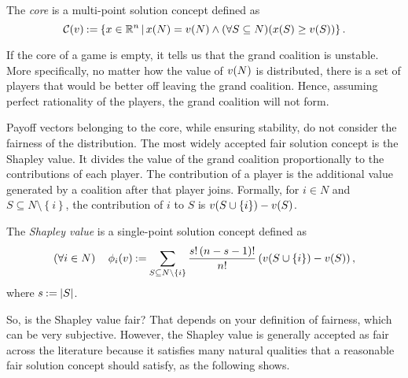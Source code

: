 \begin{defi}
	The \emph{core} is a multi-point solution concept defined as \[
		\core v \deq \left\{ x \in \R^n \suchthat \fce{x}{N} =\fce{v}{N} \land \left( \forall S \subseteq N \right)\! \left( \fce{x}{S} \geq \fce{v}{S} \right) \right\}.
	\]
\end{defi}

If the core of a game is empty, it tells us that the grand coalition is unstable.
More specifically, no matter how the value of $ \fce{v}{N} $ is distributed, there is a set of players that would be better off leaving the grand coalition.
Hence, assuming perfect rationality of the players, the grand coalition will not form.

Payoff vectors belonging to the core, while ensuring stability, do not consider the fairness of the distribution.
The most widely accepted fair solution concept is the Shapley value.
It divides the value of the grand coalition proportionally to the contributions of each player.
The contribution of a player is the additional value generated by a coalition after that player joins.
Formally, for $ i \in N $ and $ S \subseteq N \setminus \left\{ i \right\} $, the contribution of $ i $ to $ S $ is $ \fce{v}{S \cup \left\{ i \right\}} - \fce{v}{S} $.

\begin{defi}
	The \emph{Shapley value} is a single-point solution concept defined as \[
		\left( \forall i \in N \right)\quad \shapley[i] v \deq \sum_{S \subseteq N \setminus \left\{ i \right\}}^{} \frac{s! \left( n - s - 1 \right)!}{n!} \left( \fce{v}{S \cup \left\{ i \right\}} - \fce{v}{S} \right),
	\]
	where $ s \deq \absolute{S} $.
\end{defi}

So, is the Shapley value fair?
That depends on your definition of fairness, which can be very subjective.
However, the Shapley value is generally accepted as fair across the literature because it satisfies many natural qualities that a reasonable fair solution concept should satisfy, as the following shows.


